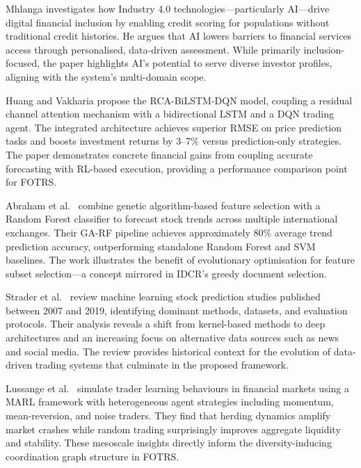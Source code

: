 \documentclass[12pt,a4paper,oneside]{report}
\theoremstyle{definition}
\theoremstyle{remark}
\begin{document}
\medskip

\noindent Mhlanga \cite{Mhlanga2020AI4Finance} investigates how Industry 4.0 technologies---particularly AI---drive digital financial inclusion by enabling credit scoring for populations without traditional credit histories. He argues that AI lowers barriers to financial services access through personalised, data-driven assessment. While primarily inclusion-focused, the paper highlights AI's potential to serve diverse investor profiles, aligning with the system's multi-domain scope.

\medskip

\noindent Huang and Vakharia \cite{Huang2024RCABiLSTM} propose the RCA-BiLSTM-DQN model, coupling a residual channel attention mechanism with a bidirectional LSTM and a DQN trading agent. The integrated architecture achieves superior RMSE on price prediction tasks and boosts investment returns by 3--7\% versus prediction-only strategies. The paper demonstrates concrete financial gains from coupling accurate forecasting with RL-based execution, providing a performance comparison point for FOTRS.

\medskip

\noindent Abraham et al.\ \cite{Abraham2022GARandomForest} combine genetic algorithm-based feature selection with a Random Forest classifier to forecast stock trends across multiple international exchanges. Their GA-RF pipeline achieves approximately 80\% average trend prediction accuracy, outperforming standalone Random Forest and SVM baselines. The work illustrates the benefit of evolutionary optimisation for feature subset selection---a concept mirrored in IDCR's greedy document selection.

\medskip

\noindent Strader et al.\ \cite{Strader2020MLStockReview} review machine learning stock prediction studies published between 2007 and 2019, identifying dominant methods, datasets, and evaluation protocols. Their analysis reveals a shift from kernel-based methods to deep architectures and an increasing focus on alternative data sources such as news and social media. The review provides historical context for the evolution of data-driven trading systems that culminate in the proposed framework.

\medskip

\noindent Lussange et al.\ \cite{Lussange2024MARL} simulate trader learning behaviours in financial markets using a MARL framework with heterogeneous agent strategies including momentum, mean-reversion, and noise traders. They find that herding dynamics amplify market crashes while random trading surprisingly improves aggregate liquidity and stability. These mesoscale insights directly inform the diversity-inducing coordination graph structure in FOTRS.
\end{document}
